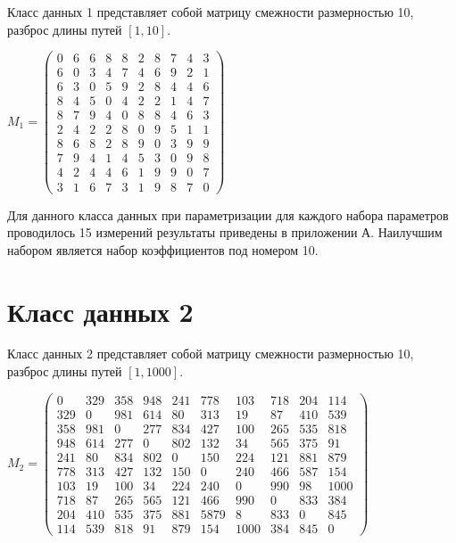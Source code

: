 Класс данных 1 представляет собой матрицу смежности размерностью 10, разброс длины путей $[1, 10]$.

$M_{1} = 
\begin{pmatrix}0 & 6 & 6 & 8 & 8 & 2 & 8 & 7 & 4 & 3 \\
			6 & 0 & 3 & 4 & 7 & 4 & 6 & 9 & 2 & 1 \\
			6 & 3 & 0 & 5 & 9 & 2 & 8 & 4 & 4 & 6 \\
			8 & 4 & 5 & 0 & 4 & 2 & 2 & 1 & 4 & 7 \\
			8 & 7 & 9 & 4 & 0 & 8 & 8 & 4 & 6 & 3 \\
			2 & 4 & 2 & 2 & 8 & 0 & 9 & 5 & 1 & 1 \\
			8 & 6 & 8 & 2 & 8 & 9 & 0 & 3 & 9 & 9 \\
			7 & 9 & 4 & 1 & 4 & 5 & 3 & 0 & 9 & 8 \\
			4 & 2 & 4 & 4 & 6 & 1 & 9 & 9 & 0 & 7 \\
			3 & 1 & 6 & 7 & 3 & 1 & 9 & 8 & 7 & 0 \end{pmatrix}$

Для данного класса данных при параметризации для каждого набора параметров проводилось 15 измерений результаты приведены в приложении А. Наилучшим набором является набор коэффициентов под номером 10.


\section{Класс данных 2}

Класс данных 2 представляет собой матрицу смежности размерностью 10, разброс длины путей $[1, 1000]$.

$M_{2} = 
\begin{pmatrix}0 & 329 & 358 & 948 & 241 & 778 & 103 & 718 & 204 & 114 \\
			329 & 0 & 981 & 614 & 80 & 313 & 19 & 87 & 410 & 539 \\
			358 & 981 & 0 & 277 & 834 & 427 & 100 & 265 & 535 & 818 \\
			948 & 614 & 277 & 0 & 802 & 132 & 34 & 565 & 375 & 91 \\
			241 & 80 & 834 & 802 & 0 & 150 & 224 & 121 & 881 & 879 \\
			778 & 313 & 427 & 132 & 150 & 0 & 240 & 466 & 587 & 154 \\
			103 & 19 & 100 & 34 & 224 & 240 & 0 & 990 & 98 & 1000 \\
			718 & 87 & 265 & 565 & 121 & 466 & 990 & 0 & 833 & 384 \\
			204 & 410 & 535 & 375 & 881 & 587 9& 8 & 833 & 0 & 845 \\
			114 & 539 & 818 & 91 & 879 & 154 & 1000 & 384 & 845 & 0 \end{pmatrix}$

